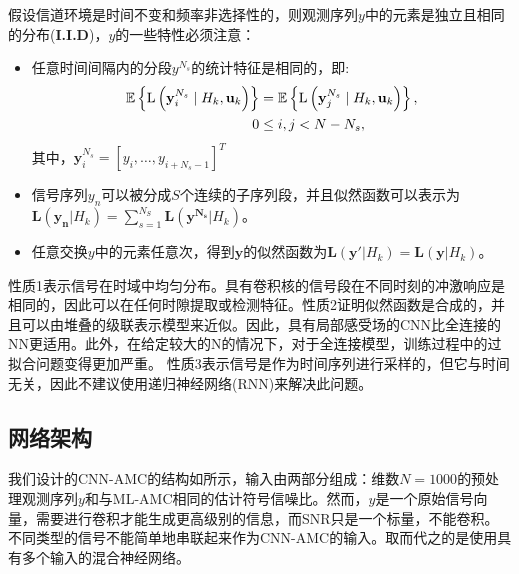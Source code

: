 \documentclass[final]{cvpr}
\begin{document}
假设信道环境是时间不变和频率非选择性的，则观测序列$y$中的元素是独立且相同的分布(\textbf{I.I.D})，$y$的一些特性必须注意：
\begin{itemize}
\item 任意时间间隔内的分段$y^{N_s}$的统计特征是相同的，即:
\begin{equation}
\begin{aligned}
\mathbb{E}\left\{\mathrm{L}\left(\mathbf{y}_{i}^{N_{s}} \mid H_{k}, \mathbf{u}_{k}\right)\right\} &=\mathbb{E}\left\{\mathrm{L}\left(\mathbf{y}_{j}^{N_{s}} \mid H_{k}, \mathbf{u}_{k}\right)\right\}, \\
0 & \leq i, j<N-N_{s},\notag
\end{aligned}
\end{equation}
其中，$\boldsymbol{y}_i^{N_s}=[y_i,\dots,y_{i+N_s−1}]^T$
\item 信号序列$y_n$可以被分成$S$个连续的子序列段，并且似然函数可以表示为$\boldsymbol{L}(\boldsymbol{y_n}|H_k)=\sum^{N_S}_{s=1}\boldsymbol{L}(\boldsymbol{y^{N_s}}|H_k)$。
\item 任意交换$y$中的元素任意次，得到$\boldsymbol{y}$的似然函数为$\boldsymbol{L}(\boldsymbol{y}'|H_k)=\boldsymbol{L}(\boldsymbol{y}|H_k)$。
\end{itemize}

性质1表示信号在时域中均匀分布。具有卷积核的信号段在不同时刻的冲激响应是相同的，因此可以在任何时隙提取或检测特征。性质2证明似然函数是合成的，并且可以由堆叠的级联表示模型来近似。因此，具有局部感受场的CNN比全连接的NN更适用。此外，在给定较大的N的情况下，对于全连接模型，训练过程中的过拟合问题变得更加严重。
性质3表示信号是作为时间序列进行采样的，但它与时间无关，因此不建议使用递归神经网络(RNN)来解决此问题。
\subsection{网络架构}\label{networkarchitecture}

我们设计的CNN-AMC的结构如所示，输入由两部分组成：维数$N=1000$的预处理观测序列$y$和与ML-AMC相同的估计符号信噪比。然而，$y$是一个原始信号向量，需要进行卷积才能生成更高级别的信息，而SNR只是一个标量，不能卷积。不同类型的信号不能简单地串联起来作为CNN-AMC的输入。取而代之的是使用具有多个输入的混合神经网络。
\end{document}
